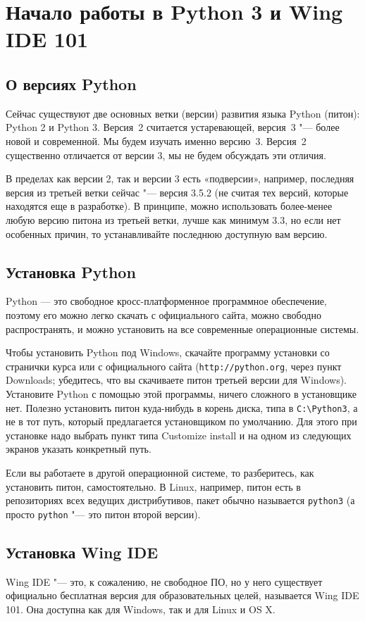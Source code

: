 \section{Начало работы в Python 3 и Wing IDE 101}

\subsection{О версиях Python}

Сейчас существуют две основных ветки (версии) развития языка Python (питон): Python 2 и Python 3. 
Версия~2 считается устаревающей, версия~3 "--- более новой и современной. 
Мы будем изучать именно версию~3. Версия~2 существенно отличается от версии 3, мы не будем обсуждать эти отличия.

В пределах как версии 2, так и версии 3 есть «подверсии», например, последняя версия из третьей ветки 
сейчас "--- версия 3.5.2 (не считая тех версий, которые находятся еще в разработке). 
В принципе, можно использовать более-менее любую версию питона из
третьей ветки, лучше как минимум 3.3, но если нет особенных причин, то устанавливайте последнюю
доступную вам версию.

\subsection{Установка Python}
Python — это свободное кросс-платформенное программное обеспечение, поэтому его можно легко
скачать с официального сайта, можно свободно распространять, и можно установить на все современные операционные
системы.

Чтобы установить Python под Windows, скачайте программу установки со странички курса или с официального сайта
(\verb`http://python.org`, через пункт Downloads; убедитесь, что вы скачиваете питон третьей версии для Windows). 
Установите Python с помощью этой программы, ничего сложного в установщике нет. 
Полезно установить питон куда-нибудь в корень диска, типа в \verb`C:\Python3`, а не в тот путь, 
который предлагается установщиком по умолчанию. Для этого при установке надо выбрать пункт типа Customize install 
и на одном из следующих экранов указать конкретный путь.

Если вы работаете в другой операционной системе, то разберитесь, как установить питон, самостоятельно. В Linux,
например, питон есть в репозиториях всех ведущих дистрибутивов, пакет обычно называется \verb`python3` 
(а просто \verb`python` "--- это питон второй версии).

\subsection{Установка Wing IDE}
Wing IDE "--- это, к сожалению, не свободное ПО, но у него существует официально бесплатная версия для 
образовательных целей, называется Wing IDE 101. Она доступна как для Windows, так и для Linux и OS X.

